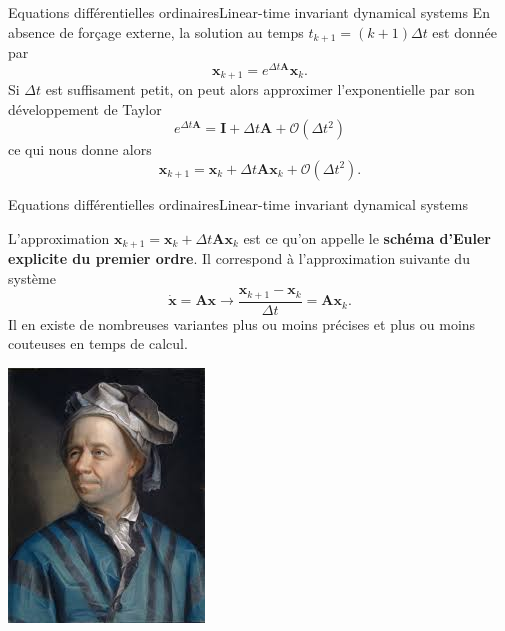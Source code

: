 \documentclass[usenames,dvipsnames,svgnames,10pt,aspectratio=169]{beamer}
\begin{document}
\begin{frame}[t, c]{Equations différentielles ordinaires}{Linear-time invariant dynamical systems}
  En absence de forçage externe, la solution au temps $t_{k+1} = (k+1)\Delta t$ est donnée par
  \[
  \bm{x}_{k+1} = e^{\Delta t \bm{A}} \bm{x}_k.
  \]
  Si $\Delta t$ est suffisament petit, on peut alors approximer l'exponentielle par son développement de Taylor
  \[
  e^{\Delta t \bm{A}} = \bm{I} + \Delta t \bm{A} + \mathcal{O}(\Delta t^2)
  \]
  ce qui nous donne alors
  \[
  \bm{x}_{k+1} = \bm{x}_k + \Delta t \bm{Ax}_k + \mathcal{O}(\Delta t^2).
  \]
\end{frame}

\begin{frame}[t, c]{Equations différentielles ordinaires}{Linear-time invariant dynamical systems}
  \begin{minipage}{.68\textwidth}
    L'approximation $\bm{x}_{k+1} = \bm{x}_k + \Delta t \bm{Ax}_k$ est ce qu'on appelle le \alert{\textbf{schéma d'Euler explicite du premier ordre}}.
    Il correspond à l'approximation suivante du système
    \[
    \dot{\bm{x}} = \bm{Ax} \to \dfrac{\bm{x}_{k+1} - \bm{x}_k}{\Delta t} = \bm{Ax}_k.
    \]
    Il en existe de nombreuses variantes plus ou moins précises et plus ou moins couteuses en temps de calcul.
  \end{minipage}%
  \hfill
  \begin{minipage}{.28\textwidth}
    \centering
    \includegraphics[width=\textwidth]{euler}
  \end{minipage}
\end{frame}
\end{document}

